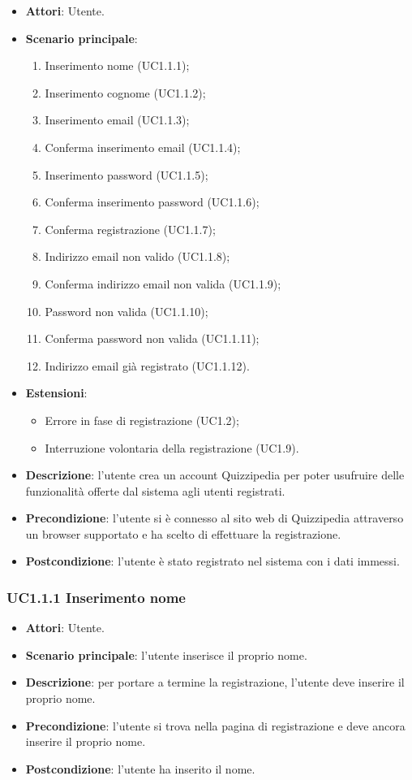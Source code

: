 \begin{itemize}
\item \textbf{Attori}: Utente.
\item \textbf{Scenario principale}:
\begin{enumerate}
\item Inserimento nome (UC1.1.1);
\item Inserimento cognome (UC1.1.2);
\item Inserimento email (UC1.1.3);
\item Conferma inserimento email (UC1.1.4);
\item Inserimento password (UC1.1.5);
\item Conferma inserimento password (UC1.1.6);
\item Conferma registrazione (UC1.1.7);
\item Indirizzo email non valido (UC1.1.8);
\item Conferma indirizzo email non valida (UC1.1.9);
\item Password non valida (UC1.1.10);
\item Conferma password non valida (UC1.1.11);
\item Indirizzo email già registrato (UC1.1.12).
\end{enumerate}
\item \textbf{Estensioni}:
\begin{itemize}
\item Errore in fase di registrazione (UC1.2);
\item Interruzione volontaria della registrazione (UC1.9).
\end{itemize}
\item \textbf{Descrizione}: l'utente crea un account Quizzipedia per poter usufruire delle funzionalità offerte dal sistema agli utenti registrati.
\item \textbf{Precondizione}: l'utente si è connesso al sito web di Quizzipedia attraverso un browser supportato e ha scelto di effettuare la registrazione.
\item \textbf{Postcondizione}: l'utente è stato registrato nel sistema con i dati immessi.
\end{itemize}
\subsubsection{UC1.1.1 Inserimento nome}
\begin{itemize}
\item \textbf{Attori}: Utente.
\item \textbf{Scenario principale}: l'utente inserisce il proprio nome.
\item \textbf{Descrizione}: per portare a termine la registrazione, l'utente deve inserire il proprio nome.
\item \textbf{Precondizione}: l'utente si trova nella pagina di registrazione e deve ancora inserire il proprio nome.
\item \textbf{Postcondizione}: l'utente ha inserito il nome.
\end{itemize}
